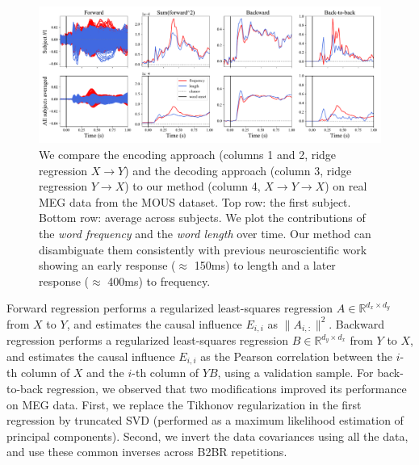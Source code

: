 \begin{figure}[t!]
  \centering
  \includegraphics[width=\textwidth, trim=0cm 0cm 0cm 0cm, clip=True]{figures/meg_twocurves.pdf}
  \caption{We compare the encoding approach (columns 1 and 2, ridge regression $X \rightarrow Y$) and the decoding approach (column 3, ridge regression $Y \rightarrow X$) to our method (column 4, $X \rightarrow Y \rightarrow X$) on real MEG data from the MOUS dataset. Top row: the first subject. Bottom row: average across subjects.
  We plot the contributions of the \textit{word frequency} and the \textit{word
  length} over time. Our method can disambiguate them consistently with
  previous neuroscientific work showing an early response ($\approx$ 150ms) to
  length and a later response ($\approx$ 400ms) to frequency.}
  \label{fig:meg_twocurves}
\end{figure}

Forward regression performs a regularized least-squares regression $A \in \mathbb{R}^{d_x \times d_y}$ from $X$ to $Y$, and estimates the causal influence $E_{i,i}$ as $\| A_{i, :} \|^2$.
%
Backward regression performs a regularized least-squares regression $B \in \mathbb{R}^{d_y \times d_x}$ from $Y$ to $X$, and estimates the causal influence $E_{i, i}$ as the Pearson correlation between the $i$-th column of $X$ and the $i$-th column of $YB$, using a validation sample.
%
For back-to-back regression, we observed that two modifications improved its performance on MEG data.
%
First, we replace the Tikhonov regularization in the first regression by truncated SVD (performed as a maximum likelihood estimation of principal components).
%
Second, we invert the data covariances using all the data, and use these common inverses across B2BR repetitions.

